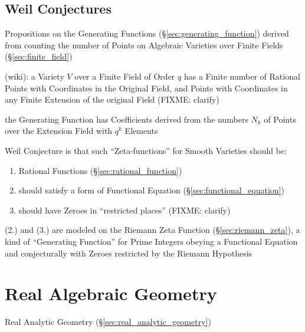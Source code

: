 \subsection{Weil Conjectures}\label{sec:weil_conjectures}

Propositions on the Generating Functions (\S\ref{sec:generating_function})
derived from counting the number of Points on Algebraic Varieties over Finite
Fields (\S\ref{sec:finite_field})

(wiki): a Variety $V$ over a Finite Field of Order $q$ has a Finite number of
Rational Points with Coordinates in the Original Field, and Points with
Coordinates in any Finite Extension of the original Field (FIXME: clarify)

the Generating Function has Coefficients derived from the numbers $N_k$ of
Points over the Extension Field with $q^k$ Elements

Weil Conjecture is that such ``Zeta-functions'' for Smooth Varieties should be:
\begin{enumerate}
  \item Rational Functions (\S\ref{sec:rational_function})
  \item should satisfy a form of Functional Equation
    (\S\ref{sec:functional_equation})
  \item should have Zeroes in ``restricted places'' (FIXME: clarify)
\end{enumerate}

(2.) and (3.) are modeled on the Riemann Zeta Function
(\S\ref{sec:riemann_zeta}), a kind of ``Generating Function'' for Prime Integers
obeying a Functional Equation and conjecturally with Zeroes restricted by the
Riemann Hypothesis



\section{Real Algebraic Geometry}\label{sec:real_algebraic_geometry}

Real Analytic Geometry (\S\ref{sec:real_analytic_geometry})



